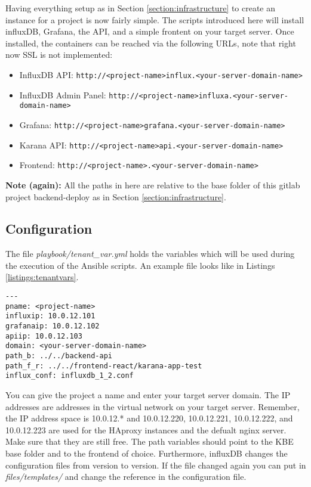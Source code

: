 Having everything setup as in Section \ref{section:infrastructure} to create an instance for a project is now fairly simple. The scripts introduced here will install influxDB, Grafana, the API, and a simple frontent on your target server. Once installed, the containers can be reached via the following URLs, note that right now SSL is not implemented:
\begin{itemize}
	\item InfluxDB API: \nolinkurl{http://<project-name>influx.<your-server-domain-name>}
	\item InfluxDB Admin Panel: \nolinkurl{http://<project-name>influxa.<your-server-domain-name>}	
	\item Grafana: \nolinkurl{http://<project-name>grafana.<your-server-domain-name>}
	\item Karana API: \nolinkurl{http://<project-name>api.<your-server-domain-name>}
	\item Frontend: \nolinkurl{http://<project-name>.<your-server-domain-name>}
\end{itemize}
\textbf{Note (again):} All the paths in here are relative to the base folder of this gitlab project backend-deploy as in Section \ref{section:infrastructure}.

\subsection{Configuration}
The file \textit{playbook/tenant\_var.yml} holds the variables which will be used during the execution of the Ansible scripts. An example file looks like in Listings \ref{listings:tenantvars}.
\begin{lstlisting}[caption={Example of Ansible hosts file},label={listings:tenantvars}]
---
pname: <project-name>
influxip: 10.0.12.101
grafanaip: 10.0.12.102
apiip: 10.0.12.103
domain: <your-server-domain-name>
path_b: ../../backend-api
path_f_r: ../../frontend-react/karana-app-test
influx_conf: influxdb_1_2.conf
\end{lstlisting}
You can give the project a name and enter your target server domain. The IP addresses are addresses in the virtual network on your target server. Remember, the IP address space is 10.0.12.* and  10.0.12.220, 10.0.12.221, 10.0.12.222, and  10.0.12.223 are used for the HAproxy instances and the defualt nginx server.  Make sure that they are still free. The path variables should point to the KBE base folder and to the frontend of choice. Furthermore, influxDB changes the configuration files from version to version. If the file changed again you can put in \textit{files/templates/} and change the reference in the configuration file. 

